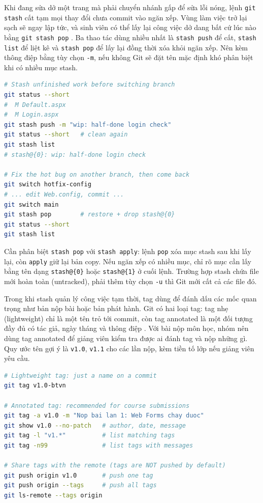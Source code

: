 Khi đang sửa dở một trang mà phải chuyển nhánh gấp để sửa lỗi nóng, lệnh \verb|git stash| cất tạm mọi thay đổi chưa commit vào ngăn xếp.
Vùng làm việc trở lại sạch sẽ ngay lập tức, và sinh viên có thể lấy lại công việc dở dang bất cứ lúc nào bằng \verb|git stash pop| \cite{progit}.
Ba thao tác dùng nhiều nhất là \verb|stash push| để cất, \verb|stash list| để liệt kê và \verb|stash pop| để lấy lại đồng thời xóa khỏi ngăn xếp.
Nên kèm thông điệp bằng tùy chọn \verb|-m|, nếu không Git sẽ đặt tên mặc định khó phân biệt khi có nhiều mục stash.

\begin{lstlisting}[language=bash]
# Stash unfinished work before switching branch
git status --short
#  M Default.aspx
#  M Login.aspx
git stash push -m "wip: half-done login check"
git status --short   # clean again
git stash list
# stash@{0}: wip: half-done login check

# Fix the hot bug on another branch, then come back
git switch hotfix-config
# ... edit Web.config, commit ...
git switch main
git stash pop        # restore + drop stash@{0}
git status --short
git stash list
\end{lstlisting}

Cần phân biệt \verb|stash pop| với \verb|stash apply|: lệnh \verb|pop| xóa mục stash sau khi lấy lại, còn \verb|apply| giữ lại bản copy.
Nếu ngăn xếp có nhiều mục, chỉ rõ mục cần lấy bằng tên dạng \verb|stash@{0}| hoặc \verb|stash@{1}| ở cuối lệnh.
Trường hợp stash chứa file mới hoàn toàn (untracked), phải thêm tùy chọn \verb|-u| thì Git mới cất cả các file đó.

Trong khi stash quản lý công việc tạm thời, tag dùng để đánh dấu các mốc quan trọng như bản nộp bài hoặc bản phát hành.
Git có hai loại tag: tag nhẹ (lightweight) chỉ là một tên trỏ tới commit, còn tag annotated là một đối tượng đầy đủ có tác giả, ngày tháng và thông điệp \cite{progit}.
Với bài nộp môn học, nhóm nên dùng tag annotated để giảng viên kiểm tra được ai đánh tag và nộp những gì.
Quy ước tên gợi ý là \verb|v1.0|, \verb|v1.1| cho các lần nộp, kèm tiền tố lớp nếu giảng viên yêu cầu.

\begin{lstlisting}[language=bash]
# Lightweight tag: just a name on a commit
git tag v1.0-btvn

# Annotated tag: recommended for course submissions
git tag -a v1.0 -m "Nop bai lan 1: Web Forms chay duoc"
git show v1.0 --no-patch   # author, date, message
git tag -l "v1.*"          # list matching tags
git tag -n99               # list tags with messages

# Share tags with the remote (tags are NOT pushed by default)
git push origin v1.0       # push one tag
git push origin --tags     # push all tags
git ls-remote --tags origin
\end{lstlisting}

